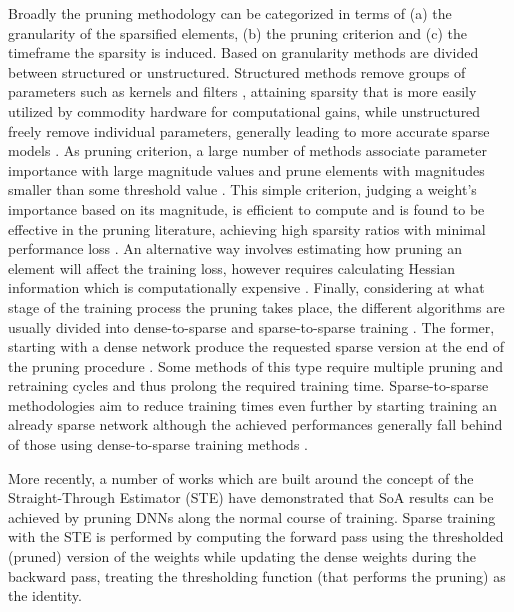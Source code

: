 \documentclass{article}
\begin{document}
Broadly the pruning methodology can be categorized in terms of (a) the granularity of the sparsified elements, (b) the pruning criterion and (c) the timeframe the sparsity is induced.
Based on granularity methods are divided between structured or unstructured. Structured methods remove groups of parameters such as kernels and filters \cite{li2016pruning, molchanov2016pruning}, attaining sparsity that is more easily utilized by commodity hardware for computational gains, while unstructured freely remove individual parameters, generally leading to more accurate sparse models \cite{han2015deep, han2015learning}.
As pruning criterion, a large number of methods associate parameter importance with large magnitude values and prune elements with magnitudes smaller than some threshold value \cite{han2015deep, han2015learning, zhu2017prune}. This simple criterion, judging a weight's importance based on its magnitude, is efficient to compute and is found to be effective in the pruning literature, achieving high sparsity ratios with minimal performance loss \cite{han2015learning, gale2019state}. An alternative way involves estimating how pruning an element will affect the training loss, however requires calculating Hessian information which is computationally expensive \cite{hassibi1993optimal,dong2017learning, aghasi2020fast}.
Finally, considering at what stage of the training process the pruning takes place, the different algorithms are usually divided into dense-to-sparse and sparse-to-sparse training \cite{kusupati2020soft}. The former, starting with a dense network produce the requested sparse version at the end of the pruning procedure \cite{han2015learning,kusupati2020soft,zhu2017prune}. Some methods of this type require multiple pruning and retraining cycles \cite{renda2020comparing} and thus prolong the required training time. Sparse-to-sparse methodologies aim to reduce training times even further by starting training an already sparse network\cite{mocanu2018scalable, dettmers2019sparse, mocanu2021sparse} although the achieved performances generally fall behind of those using dense-to-sparse training methods \cite{kusupati2020soft}.\par 
 
More recently, a number of works \cite{retsinas2021online, jayakumar2020top, tai2022spartan, vanderschueren2023straight} which are built around the concept of the Straight-Through Estimator (STE) \cite{bengio2013estimating} have demonstrated that SoA results can be achieved by pruning DNNs along the normal course of training. Sparse training with the STE is performed by computing the forward pass using the thresholded (pruned) version of the weights while updating the dense weights during the backward pass, treating the thresholding function (that performs the pruning) as the identity. 
\end{document}
